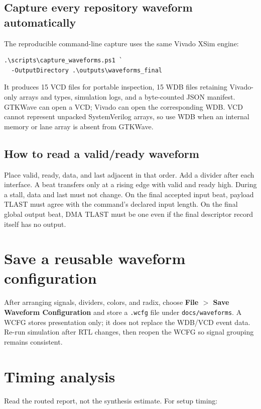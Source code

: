 \documentclass[10pt]{article}
\begin{document}
\subsection{Capture every repository waveform automatically}

The reproducible command-line capture uses the same Vivado XSim engine:

\begin{lstlisting}
.\scripts\capture_waveforms.ps1 `
  -OutputDirectory .\outputs\waveforms_final
\end{lstlisting}

It produces 15 VCD files for portable inspection, 15 WDB files retaining
Vivado-only arrays and types, simulation logs, and a byte-counted JSON
manifest. GTKWave can open a VCD; Vivado can open the corresponding WDB. VCD
cannot represent unpacked SystemVerilog arrays, so use WDB when an internal
memory or lane array is absent from GTKWave.

\subsection{How to read a valid/ready waveform}

Place valid, ready, data, and last adjacent in that order. Add a divider after
each interface. A beat transfers only at a rising edge with valid and ready
high. During a stall, data and last must not change. On the final accepted input
beat, payload TLAST must agree with the command's declared input length. On the
final global output beat, DMA TLAST must be one even if the final descriptor
record itself has no output.

\section{Save a reusable waveform configuration}

After arranging signals, dividers, colors, and radix, choose
\textbf{File $>$ Save Waveform Configuration} and store a \texttt{.wcfg} file
under \texttt{docs/waveforms}. A WCFG stores presentation only; it does not
replace the WDB/VCD event data. Re-run simulation after RTL changes, then reopen
the WCFG so signal grouping remains consistent.

\section{Timing analysis}

Read the routed report, not the synthesis estimate. For setup timing:
\end{document}
